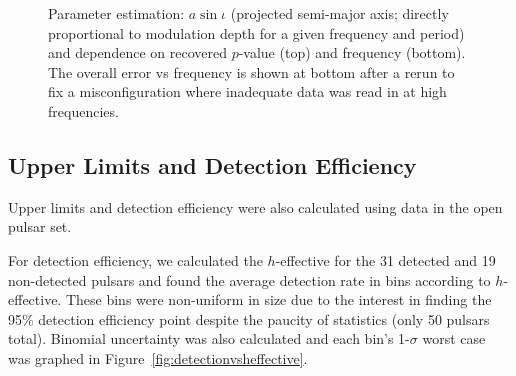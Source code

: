 \begin{figure}
\begin{center}
\caption{Parameter estimation: $a \sin\iota$ (projected semi-major axis; directly proportional to modulation depth for a given frequency and period) and dependence on recovered $p$-value (top) and frequency (bottom). 
The overall error vs frequency is shown at bottom after a rerun to fix a misconfiguration where inadequate data was read in at high frequencies.
\label{fig:errorasini}}
\end{center}
\end{figure}


\subsection{Upper Limits and Detection Efficiency}

Upper limits and detection efficiency were also calculated using data in the open pulsar set.

For detection efficiency, we calculated the $h$-effective for the 31 detected and 19 non-detected pulsars and found the average detection rate in bins according to $h$-effective. These bins were non-uniform in size due to the interest in finding the 95\% detection efficiency point despite the paucity of statistics (only 50 pulsars total). 
Binomial uncertainty was also calculated and each bin's 1-$\sigma$ worst case was graphed in Figure~\ref{fig:detectionvsheffective}. 

